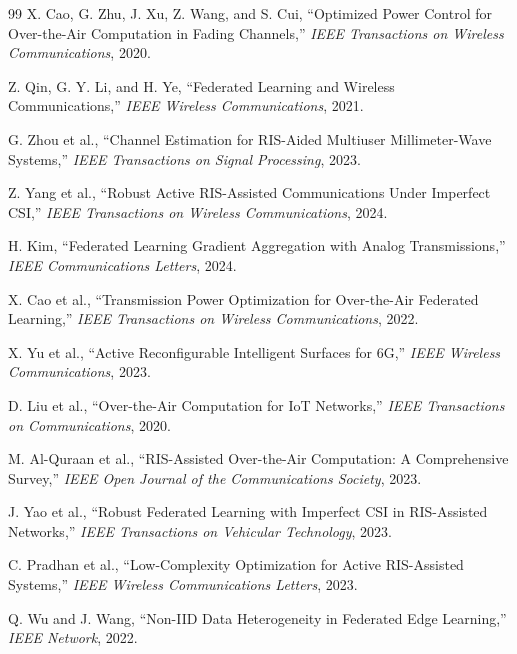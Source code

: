 \documentclass[journal, twocolumn]{IEEEtran}
\begin{document}
\begin{thebibliography}{99}
X. Cao, G. Zhu, J. Xu, Z. Wang, and S. Cui, ``Optimized Power Control for Over-the-Air Computation in Fading Channels,'' \textit{IEEE Transactions on Wireless Communications}, 2020.

Z. Qin, G. Y. Li, and H. Ye, ``Federated Learning and Wireless Communications,'' \textit{IEEE Wireless Communications}, 2021.

G. Zhou et al., ``Channel Estimation for RIS-Aided Multiuser Millimeter-Wave Systems,'' \textit{IEEE Transactions on Signal Processing}, 2023.

Z. Yang et al., ``Robust Active RIS-Assisted Communications Under Imperfect CSI,'' \textit{IEEE Transactions on Wireless Communications}, 2024.

H. Kim, ``Federated Learning Gradient Aggregation with Analog Transmissions,'' \textit{IEEE Communications Letters}, 2024.

X. Cao et al., ``Transmission Power Optimization for Over-the-Air Federated Learning,'' \textit{IEEE Transactions on Wireless Communications}, 2022.

X. Yu et al., ``Active Reconfigurable Intelligent Surfaces for 6G,'' \textit{IEEE Wireless Communications}, 2023.

D. Liu et al., ``Over-the-Air Computation for IoT Networks,'' \textit{IEEE Transactions on Communications}, 2020.

M. Al-Quraan et al., ``RIS-Assisted Over-the-Air Computation: A Comprehensive Survey,'' \textit{IEEE Open Journal of the Communications Society}, 2023.

J. Yao et al., ``Robust Federated Learning with Imperfect CSI in RIS-Assisted Networks,'' \textit{IEEE Transactions on Vehicular Technology}, 2023.

C. Pradhan et al., ``Low-Complexity Optimization for Active RIS-Assisted Systems,'' \textit{IEEE Wireless Communications Letters}, 2023.

Q. Wu and J. Wang, ``Non-IID Data Heterogeneity in Federated Edge Learning,'' \textit{IEEE Network}, 2022.

\end{thebibliography}
\end{document}
